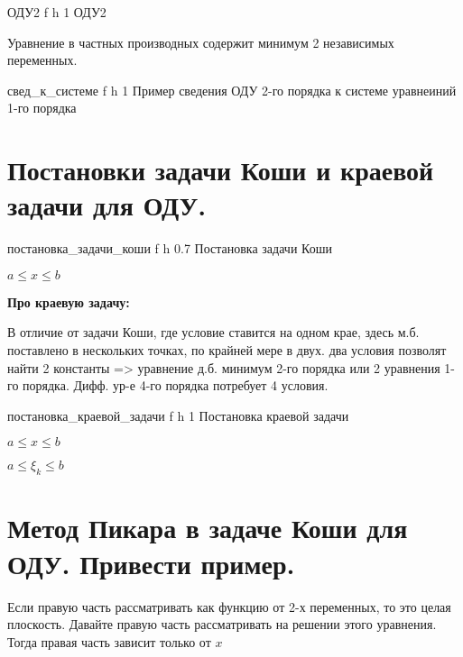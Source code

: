 {ОДУ2} %
{f} %
{h} %
{1\textwidth} %
{ОДУ2}

\clearpage

Уравнение в частных производных содержит минимум 2 независимых переменных.

{свед_к_системе} %
{f} %
{h} %
{1\textwidth} %
{Пример сведения ОДУ 2-го порядка к системе уравнеиний 1-го порядка}

\section*{Постановки задачи Коши и краевой задачи для ОДУ.} %

{постановка_задачи_коши} %
{f} %
{h} %
{0.7\textwidth} %
{Постановка задачи Коши}

$a \leq x \leq b$

\textbf{Про краевую задачу:}

В отличие от задачи Коши, где условие ставится на одном крае, здесь м.б. поставлено в нескольких точках, по крайней мере в двух. два условия позволят найти 2 константы => уравнение д.б. минимум 2-го порядка или 2 уравнения 1-го порядка. Дифф. ур-е 4-го порядка потребует 4 условия.


{постановка_краевой_задачи} %
{f} %
{h} %
{1\textwidth} %
{Постановка краевой задачи}

$a \leq x \leq b$

$a \leq \xi_k \leq b$

\section*{Метод Пикара в задаче Коши для ОДУ. Привести пример.} %

Если правую часть рассматривать как функцию от 2-х переменных, то это целая плоскость. Давайте правую часть рассматривать на решении этого уравнения. Тогда правая часть зависит только от $x$

